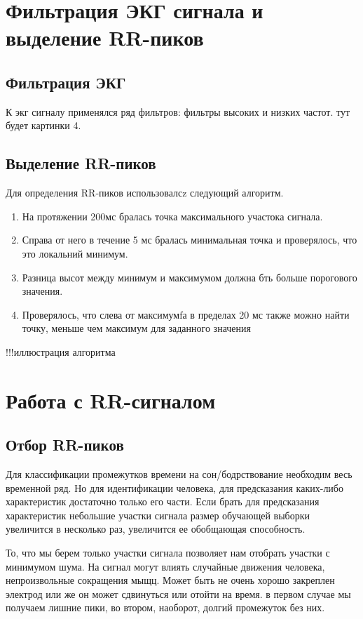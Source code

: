 \section{Фильтрация ЭКГ сигнала и выделение RR-пиков}
\subsection{Фильтрация ЭКГ}
К экг сигналу применялся ряд фильтров: фильтры высоких и низких частот. 
тут будет картинки 4.
\subsection{Выделение RR-пиков}
Для определения RR-пиков использовалсz следующий алгоритм.

\begin{enumerate}
	\item На протяжении 200мс бралась точка максимального участока сигнала.
	\item Справа от него в течение 5 мс бралась минимальная точка и проверялось, что это локальний минимум.
	\item Разница высот между минимум и максимумом должна бть больше порогового значения.
	\item Проверялось, что слева от максимумfа в пределах 20 мс также можно найти точку, меньше чем максимум для заданного значения
\end{enumerate}

!!!иллюстрация алгоритма

\section{Работа с RR-сигналом}
\subsection{Отбор RR-пиков}
Для классификации промежутков времени на сон/бодрствование необходим весь временной ряд. Но для идентификации человека, для предсказания каких-либо характеристик достаточно только его части. Если брать для предсказания характеристик небольшие участки сигнала размер обучающей выборки увеличится в несколько раз, увеличится ее обобщающая способность.

То, что мы берем только участки сигнала позволяет нам отобрать участки с минимумом шума. На сигнал могут влиять случайные движения человека, непроизвольные сокращения мыщц. Может быть не очень хорошо закреплен электрод или же он может сдвинуться или отойти на время. в первом случае мы получаем лишние пики, во втором, наоборот, долгий промежуток без них. 

